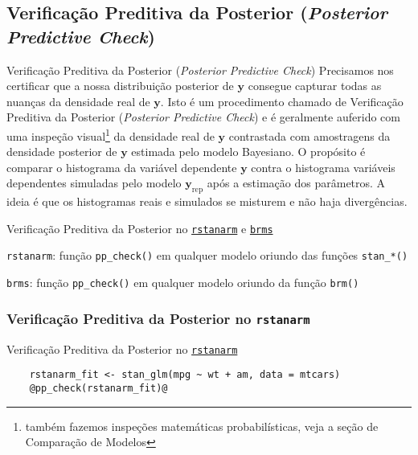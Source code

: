 \subsection{Verificação Preditiva da Posterior (\textit{Posterior Predictive Check})}
\begin{frame}{Verificação Preditiva da Posterior (\textit{Posterior Predictive Check})}
	Precisamos nos certificar que a nossa distribuição posterior de $\boldsymbol{y}$
	consegue capturar todas as nuanças da densidade real de $\boldsymbol{y}$.
	\vfill
	Isto é um procedimento chamado de Verificação Preditiva da Posterior
	(\textit{Posterior Predictive Check}) e é geralmente auferido com uma inspeção
	visual\footnote{também fazemos inspeções matemáticas probabilísticas,
		veja a seção de Comparação de Modelos} da densidade real de $\boldsymbol{y}$
	contrastada com amostragens da densidade
	posterior de $\boldsymbol{y}$ estimada pelo modelo Bayesiano.
	\vfill
	O propósito é comparar o histograma da variável dependente $\boldsymbol{y}$ contra o histograma variáveis dependentes simuladas
	pelo modelo $\boldsymbol{y}_{\text{rep}}$ após a estimação dos parâmetros. A ideia é
	que os histogramas reais e simulados se misturem e não haja divergências.
\end{frame}

\begin{frame}{Verificação Preditiva da Posterior no \href{http://mc-stan.org/rstanarm/}{\texttt{rstanarm}} e \href{https://paul-buerkner.github.io/brms/}{\texttt{brms}}}
	\begin{vfilleditems}
		\item \texttt{rstanarm}: função \lstinline!pp_check()! em qualquer modelo oriundo das funções \lstinline!stan_*()!
		\item \texttt{brms}: função \lstinline!pp_check()! em qualquer modelo oriundo da função \lstinline!brm()!
	\end{vfilleditems}
\end{frame}

\subsubsection{Verificação Preditiva da Posterior no \texttt{rstanarm}}
\begin{frame}[fragile]{Verificação Preditiva da Posterior no \href{http://mc-stan.org/rstanarm/}{\texttt{rstanarm}}}
	\begin{lstlisting}
    rstanarm_fit <- stan_glm(mpg ~ wt + am, data = mtcars)
    @pp_check(rstanarm_fit)@
    \end{lstlisting}
\end{frame}

